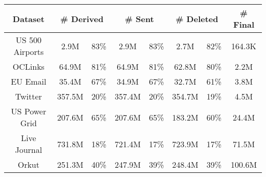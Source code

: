 \begin{tabular}{c || c | c | c | c | c | c | c} \hline
	\textbf{Dataset} & \multicolumn{2}{c|}{\textbf{\# Derived}} & \multicolumn{2}{c|}{\textbf{\# Sent}} & \multicolumn{2}{c|}{\textbf{\# Deleted}} & \textbf{\# Final} \\ \hline \hline
US 500 Airports & 2.9M  &  83\%  & 2.9M &  83\%  & 2.7M &  82\%  & 164.3K \\
OCLinks & 64.9M  &  81\%  & 64.9M &  81\%  & 62.8M &  80\%  & 2.2M \\
EU Email & 35.4M  &  67\%  & 34.9M &  67\%  & 32.7M &  61\%  & 3.8M \\
Twitter & 357.5M  &  20\%  & 357.4M &  20\%  & 354.7M &  19\%  & 4.5M \\
US Power Grid & 207.6M  &  65\%  & 207.6M &  65\%  & 183.2M &  60\%  & 24.4M \\
Live Journal & 731.8M  &  18\%  & 721.4M &  17\%  & 723.9M &  17\%  & 71.5M \\
Orkut & 251.3M  &  40\%  & 247.9M &  39\%  & 248.4M &  39\%  & 100.6M \\
	\hline
\end{tabular}
